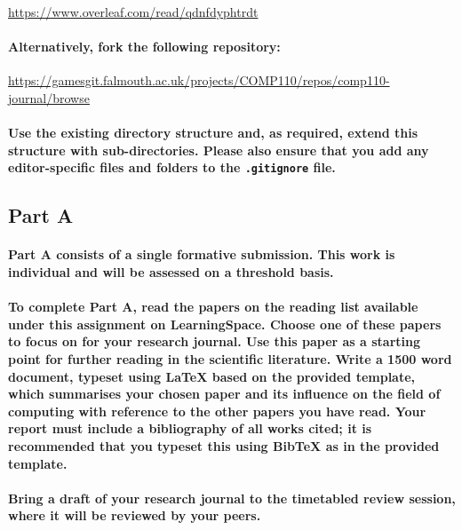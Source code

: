 \documentclass{../../fal_assignment}
\begin{document}
\url{https://www.overleaf.com/read/qdnfdyphtrdt}

\paragraph{Alternatively, fork the following repository:}

\url{https://gamesgit.falmouth.ac.uk/projects/COMP110/repos/comp110-journal/browse}

\paragraph{Use the existing directory structure and, as required, extend this structure with sub-directories.
Please also ensure that you add any editor-specific files and folders to the \texttt{.gitignore} file.}

\subsection*{Part A}

\paragraph{Part A consists of a \textbf{single formative submission}. This work is \textbf{individual} and will be assessed on a \textbf{threshold} basis.}

\paragraph{
To complete Part A, read the papers on the reading list available under this assignment on LearningSpace.
Choose \textbf{one} of these papers to focus on for your research journal.
Use this paper as a starting point for further reading in the scientific literature.
Write a 1500 word document, typeset using LaTeX based on the provided template,
which summarises your chosen paper and its influence on the field of computing
with reference to the other papers you have read.
Your report must include a bibliography of all works cited;
it is recommended that you typeset this using BibTeX as in the provided template.
}

\paragraph{
Bring a draft of your research journal to the timetabled review session,
where it will be reviewed by your peers.
}
\end{document}
